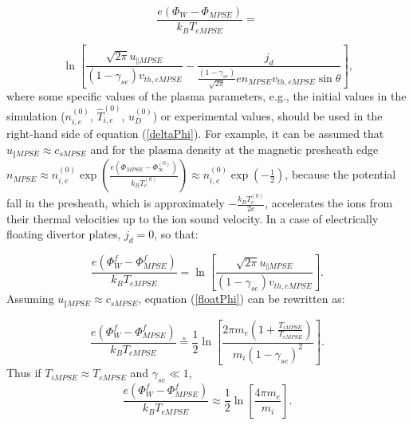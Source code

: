 \documentclass[11pt]{article}
\begin{document}
\begin{equation*}
\frac{e\left( \Phi_{W}-\Phi_{MPSE}\right) }{k_{B}T_{eMPSE}}= 
\end{equation*}

\begin{equation}
\ln\left[ \frac{\sqrt{2\pi}u_{\Vert MPSE}}{\left( 1-\gamma_{se}\right)
v_{th,eMPSE}}-\frac{j_{d}}{\frac{\left( 1-\gamma_{se}\right) }{\sqrt{2\pi}}%
en_{MPSE}v_{th,eMPSE}\sin\theta}\right] \text{,}   \label{deltaPhi}
\end{equation}
where some specific values of the plasma parameters, e.g., the initial
values in the simulation ($n_{i,e}^{\left( 0\right) }$, $\widehat{T}%
_{i,e}^{\left( 0\right) }$, $u_{D}^{\left( 0\right) }$) or experimental
values, should be used in the right-hand side of equation (\ref{deltaPhi}).
For example, it can be assumed that $u_{\Vert MPSE}\approx c_{sMPSE}$ and
for the plasma density at the magnetic presheath edge $n_{MPSE}\approx
n_{i,e}^{\left( 0\right) }\exp\left( \frac{e\left(
\Phi_{MPSE}-\Phi_{\infty}^{\left( 0\right) }\right) }{k_{B}T_{e}^{\left(
0\right) }}\right) \approx n_{i,e}^{\left( 0\right) }\exp\left( -\frac{1}{2}%
\right) $, because the potential fall in the presheath, which is
approximately $-\frac{k_{B}T_{e}^{\left( 0\right) }}{2e}$, accelerates the
ions from their thermal velocities up to the ion sound velocity. In a case
of electrically floating divertor plates, $j_{d}=0$, so that:

\begin{equation}
\frac{e\left( \Phi_{W}^{f}-\Phi_{MPSE}^{f}\right) }{k_{B}T_{eMPSE}}=\ln\left[
\frac{\sqrt{2\pi}u_{\Vert MPSE}}{\left( 1-\gamma_{se}\right) v_{th,eMPSE}}%
\right] \text{.}   \label{floatPhi}
\end{equation}
Assuming $u_{\Vert MPSE}\approx c_{sMPSE}$, equation (\ref{floatPhi}) can be
rewritten as:

\begin{equation}
\frac{e\left( \Phi_{W}^{f}-\Phi_{MPSE}^{f}\right) }{k_{B}T_{eMPSE}}\circeq%
\frac{1}{2}\ln\left[ \frac{2\pi m_{e}\left( 1+\frac{T_{iMPSE}}{T_{eMPSE}}%
\right) }{m_{i}\left( 1-\gamma_{se}\right) ^{2}}\right] \text{.} 
\label{approxFloatPhi}
\end{equation}
Thus if $T_{iMPSE}\approx T_{eMPSE}$ and $\gamma_{se}\ll1$,
\begin{equation}
\frac{e\left( \Phi_{W}^{f}-\Phi_{MPSE}^{f}\right) }{k_{B}T_{eMPSE}}\approx%
\frac{1}{2}\ln\left[ \frac{4\pi m_{e}}{m_{i}}\right] \text{.} 
\label{simpleFloatPhi}
\end{equation}
\end{document}
